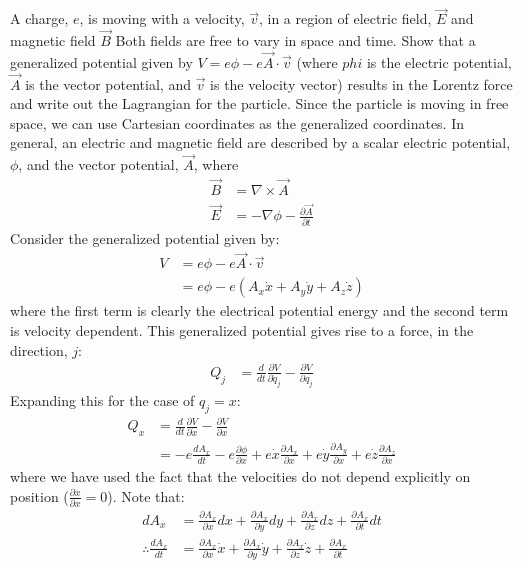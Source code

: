 \begin{example}{0pt}{A charge, $e$, is moving with a velocity, $\vec{v}$, in a region of electric field, $\vec{E}$ and magnetic field $\vec{B}$ Both fields are free to vary in space and time. Show that a generalized potential given by $V=e\phi-e\vec A\cdot \vec v $ (where $phi$ is the electric potential, $\vec A$ is the vector potential, and $\vec v$ is the velocity vector) results in the Lorentz force and write out the Lagrangian for the particle.}{}
Since the particle is moving in free space, we can use Cartesian coordinates as the generalized coordinates. In general, an electric and magnetic field are described by a scalar electric potential, $\phi$, and the vector potential, $\vec{A}$, where
\begin{align*}
\vec{B}&=\nabla \times \vec{A}\nonumber\\
\vec{E}&=-\nabla\phi-\frac{\partial\vec{A}}{\partial t}
\end{align*} 
Consider the generalized potential given by:
\begin{align*}
V&=e\phi -e\vec{A}\cdot\vec{v}\nonumber\\
&=e\phi-e(A_x\dot{x}+A_y\dot{y}+A_z\dot{z})
\end{align*}
where the first term is clearly the electrical potential energy and the second term is velocity dependent. This generalized potential gives rise to a force, in the direction, $j$:
\begin{align*}
Q_j&=\frac{d}{dt}\frac{\partial V}{\partial \dot{q}_j}-\frac{\partial V}{\partial q_j}
\end{align*}
Expanding this for the case of $q_j=x$:
\begin{align*}
Q_x&=\frac{d}{dt}\frac{\partial V}{\partial \dot{x}}-\frac{\partial V}{\partial x}\nonumber\\
&=-e\frac{dA_x}{dt}-e\frac{\partial\phi}{\partial x}+e\dot{x}\frac{\partial A_x}{\partial x}+e\dot{y}\frac{\partial A_y}{\partial x}+e\dot{z}\frac{\partial A_z}{\partial x}
\end{align*}
where we have used the fact that the velocities do not depend explicitly on position ($\frac{\partial \dot{x}}{\partial x}=0$). Note that:
\begin{align*}
dA_x&=\frac{\partial A_x}{\partial x}dx+\frac{\partial A_x}{\partial y}dy+\frac{\partial A_x}{\partial z}dz+\frac{\partial A_x}{\partial t}dt\\
\therefore \frac{dA_x}{dt} &=\frac{\partial A_x}{\partial x}\dot{x}+\frac{\partial A_x}{\partial y}\dot{y}+\frac{\partial A_x}{\partial z}\dot{z}+\frac{\partial A_x}{\partial t}

\end{align*}
\end{example}
